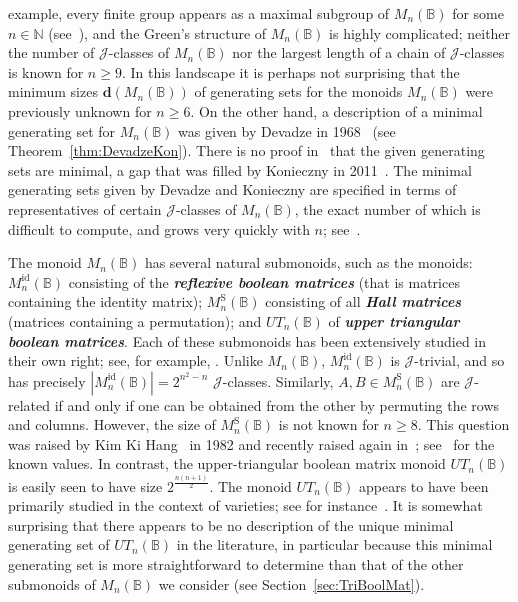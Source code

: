 \documentclass[11pt]{article}
\newcommand{\defn}[1]{\textbf{\textit{#1}}}
\numberwithin{equation}{section}
\newcommand{\B}{\mathbb{B}}
\newcommand{\Bn}{M_n(\B)}
\newcommand{\Refln}{M_n^{\text{id}}(\B)}
\newcommand{\Halln}{M_n^{\text{S}}(\B)}
\newcommand{\UTn}{UT_n(\B)}
\newcommand{\J}{\mathscr{J}}
\newcommand{\N}{\mathbb{N}}
\begin{document}
example, every finite group appears as a maximal subgroup of $\Bn$ for some $n
\in \N$ (see~\cite{Clifford1970aa, Montague1969aa, Plemmons1970ab}), and the
Green's structure of $\Bn$ is highly complicated; neither the number of
$\J$-classes of $\Bn$ nor the largest length of a chain of $\J$-classes is known
for $n\geq 9$. In this landscape it is perhaps not surprising that the minimum
sizes $\mathbf{d}(\Bn)$ of generating sets for the monoids $\Bn$ were previously
unknown for $n \geq 6$. On the other hand, a description of a minimal generating
set for $\Bn$ was given by  Devadze in 1968~\cite{Devadze1968aa} (see
Theorem~\ref{thm:DevadzeKon}). There is no proof in~\cite{Devadze1968aa} that
the given generating sets are minimal, a gap that was filled by Konieczny in
2011~\cite{Konieczny2011aa}. The minimal generating sets given by Devadze and
Konieczny are specified in terms of representatives of certain $\J$-classes of
$\Bn$, the exact number of which is difficult to compute, and grows very quickly
with $n$; see~.

The monoid $\Bn$ has several natural submonoids, such as the
monoids: $\Refln$ consisting of the \defn{reflexive boolean
  matrices} (that is matrices containing the identity matrix); $\Halln$
consisting of all \defn{Hall matrices} (matrices containing a permutation); and
$\UTn$ of \defn{upper triangular boolean matrices}. Each of these submonoids has
been extensively studied in their own right; see, for example,
\cite{Butler1974aa, Cho1993ab, Gaysin2020aa, Kim1977aa, Li2011aa, Pin1985aa,
  Schwarz1973aa, Straubing1980aa, Tan2000aa, Zhang2020aa}. Unlike $\Bn$,
$\Refln$ is $\J$-trivial, and so has precisely $|\Refln| = 2 ^ {n ^ 2 - n}$
$\J$-classes. Similarly, $A, B\in \Halln$ are $\J$-related if and only if one
can be obtained from the other by permuting the rows and columns. However, the
size of $\Halln$ is not known for $n\geq 8$. This question was raised by Kim Ki
Hang~\cite[Problem 13]{Kim1982aa} in 1982 and recently raised again
in~\cite{Gaysin2020aa}; see~\cite{OEISHall} for the known values. In contrast,
the upper-triangular boolean matrix monoid $\UTn$ is easily seen to have size
$2^{\frac{n(n+1)}{2}}$.
The monoid $\UTn$ appears to have been primarily studied in the context of
varieties; see for instance~\cite{Li2011aa, Zhang2020aa}. It is somewhat
surprising that there appears to be no description of the unique minimal
generating set of $\UTn$ in the literature, in particular because this minimal
generating set is more straightforward to determine than that of the other
submonoids of $\Bn$ we consider (see Section~\ref{sec:TriBoolMat}).
\end{document}
